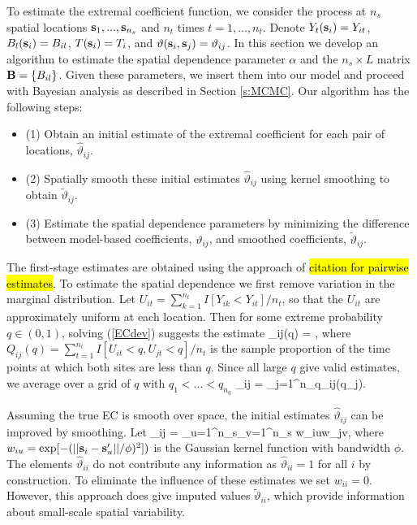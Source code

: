\documentclass[11pt]{article}
\begin{document}
To estimate the extremal coefficient function, we consider the process at $n_s$ spatial locations $\mbox{\bf s}_1,...,\mbox{\bf s}_{n_s}$ and $n_t$ times $t=1,...,n_t$.
Denote $Y_t(\mbox{\bf s}_i) = Y_{it}$, $B_l(\mbox{\bf s}_i) = B_{il}$, $T(\mbox{\bf s}_i)=T_i$, and $\vartheta(\mbox{\bf s}_i,\mbox{\bf s}_j) = \vartheta_{ij}$.
In this section we develop an algorithm to estimate the spatial dependence parameter $\alpha$ and the $n_s\times L$ matrix $\mbox{\bf B} = \{B_{il}\}$.
Given these parameters, we insert them into our model and proceed with Bayesian analysis as described in Section \ref{s:MCMC}.
Our algorithm has the following steps:
\begin{itemize}
  \item[] (1) Obtain an initial estimate of the extremal coefficient for each pair of locations, ${\hat \vartheta}_{ij}$.
  \item[] (2) Spatially smooth these initial estimates ${\hat \vartheta}_{ij}$ using kernel smoothing to obtain ${\tilde \vartheta}_{ij}$.
  \item[] (3) Estimate the spatial dependence parameters by minimizing the difference between model-based coefficients, $\vartheta_{ij}$, and smoothed coefficients, ${\tilde \vartheta}_{ij}$.
\end{itemize}

The first-stage estimates are obtained using the approach of \hl{citation for pairwise estimates}.
To estimate the spatial dependence we first remove variation in the marginal distribution.
Let $U_{it} = \sum_{k=1}^{n_t} I[Y_{ik}<Y_{it}]/n_t$, so that the $U_{it}$ are approximately uniform at each location.
Then for some extreme probability $q\in(0,1)$, solving (\ref{ECdev}) suggests the estimate
\beq\label{EChat0}
   {\hat \vartheta}_{ij}(q) = ,
\eeq
where $Q_{ij}(q) = \sum_{t=1}^{n_t}I[U_{it}<q,U_{jt}<q]/n_t$ is the sample proportion of the time points at which both sites are less than $q$.
Since all large $q$ give valid estimates, we average over a grid of $q$ with $q_1<...<q_{n_q}$
\beq\label{EChat1}
{\hat \vartheta}_{ij} = \sum_{j=1}^{n_q}{\hat \vartheta}_{ij}(q_j).
\eeq

Assuming the true EC is smooth over space, the initial estimates ${\hat \vartheta}_{ij}$ can be improved by smoothing.
Let
\beq\label{EChat2}
  {\tilde \vartheta}_{ij} = 
  {\sum_{u=1}^{n_s}\sum_{v=1}^{n_s} w_{iu}w_{jv}},
\eeq
where $w_{iu} = \exp[-(||\mbox{\bf s}_i-\mbox{\bf s}_u'||/\phi)^2])$ is the Gaussian kernel function with bandwidth $\phi$.
The elements ${\hat \vartheta}_{ii}$ do not contribute any information as ${\hat \vartheta}_{ii}=1$ for all $i$ by construction.
To eliminate the influence of these estimates we set $w_{ii}=0$.
However, this approach does give imputed values ${\tilde \vartheta}_{ii}$, which provide information about small-scale spatial variability.
\end{document}
